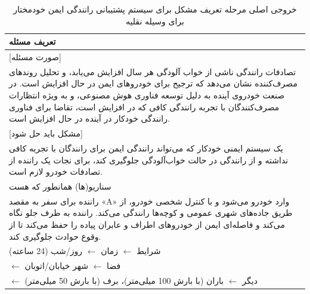 \documentclass[a4paper,10pt]{article}
\begin{document}
            \begin{table}[htbp]

                \centering
                \caption{خروجی اصلی مرحله تعریف مشکل برای سیستم پشتیبانی رانندگی ایمن خودمختار برای وسیله نقلیه}
                \begin{tabularx}{\textwidth}{X}

                    \hline

                    تعریف مسئله \\

                    \hline

                    [صورت مسئله] \\

                    تصادفات رانندگی ناشی از خواب آلودگی هر سال افزایش می‌یابد، و تحلیل روندهای مصرف‌کننده نشان می‌دهد که ترجیح برای خودروهای ایمن در حال افزایش است. در صنعت خودروی آینده به دلیل توسعه فناوری هوش مصنوعی، و به ویژه انتظارات مصرف‌کنندگان با تجربه رانندگی کافی که در افزایش است، تقاضا برای فناوری رانندگی خودکار در آینده در حال افزایش است. \\

                    [مشکل باید حل شود] \\

                    یک سیستم ایمنی خودکار که می‌تواند رانندگی ایمن برای رانندگان با تجربه کافی نداشته و از رانندگی در حالت خواب‌آلودگی جلوگیری کند، برای نجات یک راننده از تصادفات خودرو لازم است. \\

                    \hline

                    سناریو(ها) همانطور که هست \\

                    \hline

                    راننده برای سفر به مقصد «A» وارد خودرو می‌شود و با کنترل شخصی خودرو، از طریق جاده‌های شهری عمومی و کوچه‌ها رانندگی می‌کند. راننده به طرف جلو نگاه می‌کند و فاصله‌ای ایمن از خودروهای اطراف و عابران پیاده را حفظ می‌کند تا از وقوع حوادث جلوگیری کند. \\  

                    شرایط $\leftarrow$ زمان $\leftarrow$ روز/شب (24 ساعته) \\
                    \hspace{24pt} $\leftarrow$ فضا $\leftarrow$ شهر خیابان/اتوبان \\
                    \hspace{24pt} $\leftarrow$ دیگر $\leftarrow$ باران (با بارش 100 میلی‌متر)، برف (با بارش 50 میلی‌متر) \\


\end{tabularx}
\end{table}
\end{document}
